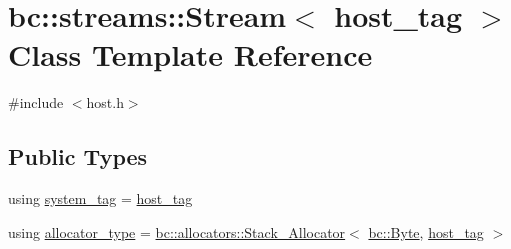 \hypertarget{classbc_1_1streams_1_1Stream_3_01host__tag_01_4}{}\section{bc\+:\+:streams\+:\+:Stream$<$ host\+\_\+tag $>$ Class Template Reference}
\label{classbc_1_1streams_1_1Stream_3_01host__tag_01_4}


{\ttfamily \#include $<$host.\+h$>$}

\subsection*{Public Types}
\begin{DoxyCompactItemize}
\item 
using \hyperlink{classbc_1_1streams_1_1Stream_3_01host__tag_01_4_a96382f855d558e07f52f8a324f5b13c4}{system\+\_\+tag} = \hyperlink{structbc_1_1host__tag}{host\+\_\+tag}
\item 
using \hyperlink{classbc_1_1streams_1_1Stream_3_01host__tag_01_4_a98a9510a8d26077263d3acab43094669}{allocator\+\_\+type} = \hyperlink{classbc_1_1allocators_1_1Stack__Allocator}{bc\+::allocators\+::\+Stack\+\_\+\+Allocator}$<$ \hyperlink{classbc_1_1allocators_1_1Byte}{bc\+::\+Byte}, \hyperlink{structbc_1_1host__tag}{host\+\_\+tag} $>$
\end{DoxyCompactItemize}
